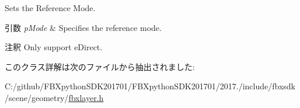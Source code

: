 Sets the Reference Mode. 
\begin{DoxyParams}{引数}
{\em p\+Mode} & Specifies the reference mode. \\
\hline
\end{DoxyParams}
\begin{DoxyRemark}{注釈}
Only support e\+Direct. 
\end{DoxyRemark}


このクラス詳解は次のファイルから抽出されました\+:\begin{DoxyCompactItemize}
\item 
C\+:/github/\+F\+B\+Xpython\+S\+D\+K201701/\+F\+B\+Xpython\+S\+D\+K201701/2017./include/fbxsdk/scene/geometry/\hyperlink{fbxlayer_8h}{fbxlayer.\+h}\end{DoxyCompactItemize}
